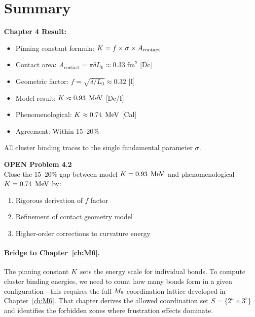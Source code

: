\section{Summary}
\label{sec:sigmaK:summary}

\begin{resultbox}
\textbf{Chapter 4 Result:}
\begin{itemize}
    \item Pinning constant formula: $K = f \times \sigma \times A_{\text{contact}}$
    \item Contact area: $A_{\text{contact}} = \pi\delta L_0 \approx 0.33\;\text{fm}^2$ [Dc]
    \item Geometric factor: $f = \sqrt{\delta/L_0} \approx 0.32$ [I]
    \item Model result: $K \approx 0.93\;\,\mathrm{MeV}$ [Dc/I]
    \item Phenomenological: $K \approx 0.74\;\,\mathrm{MeV}$ [Cal]
    \item Agreement: Within 15--20\%
\end{itemize}
All cluster binding traces to the single fundamental parameter $\sigma$.
\end{resultbox}

\begin{edcopenbox}
\textbf{OPEN Problem 4.2} \tagOPEN \\
Close the 15--20\% gap between model $K = 0.93\;\,\mathrm{MeV}$ and phenomenological
$K = 0.74\;\,\mathrm{MeV}$ by:
\begin{enumerate}
    \item Rigorous derivation of $f$ factor
    \item Refinement of contact geometry model
    \item Higher-order corrections to curvature energy
\end{enumerate}
\end{edcopenbox}

\paragraph{Bridge to Chapter~\ref{ch:M6}.}
The pinning constant $K$ sets the energy scale for individual bonds.
To compute cluster binding energies, we need to count how many bonds form
in a given configuration---this requires the full $M_6$ coordination
lattice developed in Chapter~\ref{ch:M6}. That chapter derives the
allowed coordination set $S = \{2^a \times 3^b\}$ and identifies
the forbidden zones where frustration effects dominate.

